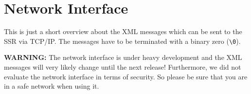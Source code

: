 

\section{Network Interface}
\label{sec:network}

This is just a short overview about the XML messages which can be sent to the
SSR via TCP/IP.
The messages have to be terminated with a binary zero (\verb|\0|).

\textbf{WARNING:} The network interface is under heavy development and the XML
messages will very likely change until the next release! Furthermore, we
did not evaluate the network interface in terms of security. So please be sure
that you are in a safe network when using it.



